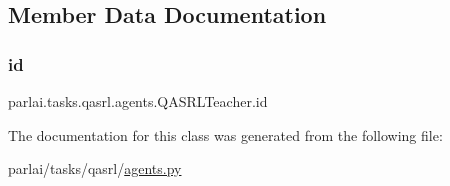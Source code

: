 \subsection{Member Data Documentation}
\mbox{\label{classparlai_1_1tasks_1_1qasrl_1_1agents_1_1QASRLTeacher_af5c5aa6c9bfe7adfebf9b58ca8ecec4c}} 
\subsubsection{\texorpdfstring{id}{id}}
{\footnotesize\ttfamily parlai.\+tasks.\+qasrl.\+agents.\+Q\+A\+S\+R\+L\+Teacher.\+id}



The documentation for this class was generated from the following file\+:\begin{DoxyCompactItemize}
\item 
parlai/tasks/qasrl/\hyperlink{parlai_2tasks_2qasrl_2agents_8py}{agents.\+py}\end{DoxyCompactItemize}
